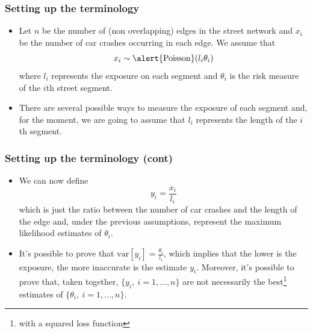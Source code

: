 \documentclass[c,10pt,pdftex]{beamer}
\begin{document}
\begin{frame}
\frametitle{Setting up the terminology}
\vspace{-0.75cm}
\begin{itemize}
	\setlength\itemsep{1em}
	\item  Let $n$ be the number of (non overlapping) edges in the street network and $x_i$ be the number of car crashes occurring in each edge. We assume that
	\[
	x_i \sim \alert{\text{Poisson}}(l_i\theta_i)
	\] 	
	where $l_i$ represents the \alert{exposure} on each segment and $\theta_i$ is the \alert{risk measure of the $i$th street segment}. 
	\item There are several possible ways to measure the exposure of each segment and, for the moment, we are going to assume that $l_i$ represents the \alert{length} of the $i$th segment. 
\end{itemize}
\end{frame}

\begin{frame}
\frametitle{Setting up the terminology (cont)}
\vspace{-0.75cm}
\begin{itemize}
	\setlength\itemsep{1em}
	\item We can now define 
	\[
	y_{i} = \frac{x_i}{l_i}
	\]  
	which is just the \alert{ratio between the number of car crashes and the length of the edge} and, under the previous assumptions, represent the maximum likelihood estimates of $\theta_i$. 
	
	
	\item It's possible to prove that $\text{var}[y_i] = \frac{\theta_i}{l_i}$, which implies that the lower is the exposure, the more inaccurate is the estimate $y_i$. Moreover, it's possible to prove that, taken together, \alert{$\lbrace y_i, \ i = 1,\dots,n\rbrace$ are not necessarily the best\footnote{with a squared loss function} estimates of $\lbrace \theta_i, \ i = 1, \dots, n \rbrace$}.   
\end{itemize}
\end{frame}
\end{document}
